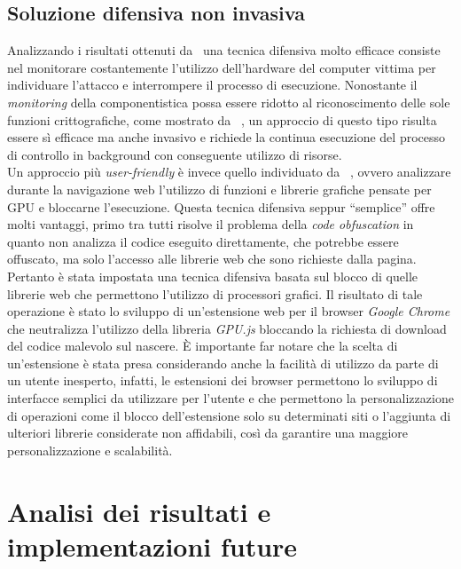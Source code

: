 \documentclass[conference, italian]{IEEEtran}
\newcommand\citen[1]{\citeauthor{#1} \citep{#1}}
\begin{document}
\subsection{Soluzione difensiva non invasiva}\label{sec:non-invasive-defence}
Analizzando i risultati ottenuti da~\citen{wang2018seismic} una tecnica difensiva molto efficace consiste nel monitorare costantemente l'utilizzo dell'hardware del computer vittima per individuare l'attacco e interrompere il processo di esecuzione. Nonostante il \emph{monitoring} della componentistica possa essere ridotto al riconoscimento delle sole funzioni crittografiche, come mostrato da~\citen{konoth2018minesweeper}, un approccio di questo tipo risulta essere sì efficace ma anche invasivo e richiede la continua esecuzione del processo di controllo in background con conseguente utilizzo di risorse.\\
Un approccio più \emph{user-friendly} è invece quello individuato da~\citen{belkin2019risks}, ovvero analizzare durante la navigazione web l'utilizzo di funzioni e librerie grafiche pensate per GPU e bloccarne l'esecuzione. Questa tecnica difensiva seppur ``semplice'' offre molti vantaggi, primo tra tutti risolve il problema della \emph{code obfuscation} in quanto non analizza il codice eseguito direttamente, che potrebbe essere offuscato, ma solo l'accesso alle librerie web che sono richieste dalla pagina. Pertanto è stata impostata una tecnica difensiva basata sul blocco di quelle librerie web che permettono l'utilizzo di processori grafici. Il risultato di tale operazione è stato lo sviluppo di un'estensione web per il browser \emph{Google Chrome} che neutralizza l'utilizzo della libreria \emph{GPU.js} bloccando la richiesta di download del codice malevolo sul nascere. È importante far notare che la scelta di un'estensione è stata presa considerando anche la facilità di utilizzo da parte di un utente inesperto, infatti, le estensioni dei browser permettono lo sviluppo di interfacce semplici da utilizzare per l'utente e che permettono la personalizzazione di operazioni come il blocco dell'estensione solo su determinati siti o l'aggiunta di ulteriori librerie considerate non affidabili, così da garantire una maggiore personalizzazione e scalabilità.


\section{Analisi dei risultati e implementazioni future}\label{sec:results-analysis}
\end{document}
